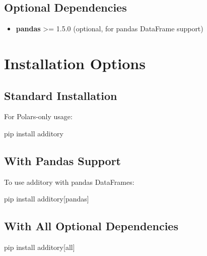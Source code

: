 \documentclass[
  letterpaper,
]{scrbook}
\newenvironment{Shaded}{\begin{snugshade}}{\end{snugshade}}
\newcommand{\ExtensionTok}[1]{\textcolor[rgb]{0.00,0.23,0.31}{#1}}
\newcommand{\NormalTok}[1]{\textcolor[rgb]{0.00,0.23,0.31}{#1}}
\newcommand{\PreprocessorTok}[1]{\textcolor[rgb]{0.68,0.00,0.00}{#1}}
\newcommand{\SpecialStringTok}[1]{\textcolor[rgb]{0.13,0.47,0.30}{#1}}
\providecommand{\tightlist}{%
  \setlength{\itemsep}{0pt}\setlength{\parskip}{0pt}}
\begin{document}
\subsection{Optional Dependencies}\label{optional-dependencies}

\begin{itemize}
\tightlist
\item
  \textbf{pandas} \textgreater= 1.5.0 (optional, for pandas DataFrame
  support)
\end{itemize}

\section{Installation Options}\label{installation-options}

\subsection{Standard Installation}\label{standard-installation}

For Polars-only usage:

\begin{Shaded}
\begin{Highlighting}[]
\ExtensionTok{pip}\NormalTok{ install additory}
\end{Highlighting}
\end{Shaded}

\subsection{With Pandas Support}\label{with-pandas-support}

To use additory with pandas DataFrames:

\begin{Shaded}
\begin{Highlighting}[]
\ExtensionTok{pip}\NormalTok{ install additory}\PreprocessorTok{[}\SpecialStringTok{pandas}\PreprocessorTok{]}
\end{Highlighting}
\end{Shaded}

\subsection{With All Optional
Dependencies}\label{with-all-optional-dependencies}

\begin{Shaded}
\begin{Highlighting}[]
\ExtensionTok{pip}\NormalTok{ install additory}\PreprocessorTok{[}\SpecialStringTok{all}\PreprocessorTok{]}
\end{Highlighting}
\end{Shaded}
\end{document}
